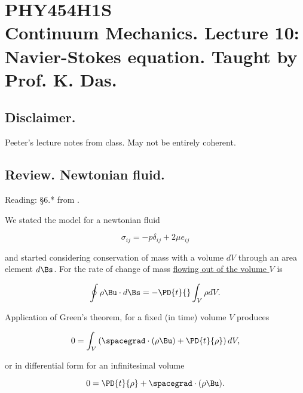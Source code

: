 
%

\chapter{PHY454H1S\\Continuum Mechanics.  Lecture 10: Navier-Stokes equation.  Taught by Prof. K. Das.}
\label{chap:continuumL10}
{}
\date{Feb 10, 2012}

\beginArtWithToc

\section{Disclaimer.}

Peeter's lecture notes from class.  May not be entirely coherent.

\section{Review.  Newtonian fluid.}

Reading: \S 6.* from \cite{acheson1990elementary}.

We stated the model for a newtonian fluid

\begin{equation}\label{eqn:continuumL10:10}
\sigma_{ij} = -p \delta_{ij} + 2 \mu e_{ij}
\end{equation}

and started considering conservation of mass with a volume $dV$ through an area element $d\Bs$.  For the rate of change of mass \underline{flowing out of the volume $V$} is 

\begin{equation}\label{eqn:continuumL10:30}
\oint \rho \Bu \cdot d\Bs = - \PD{t}{} \int_V \rho dV.
\end{equation}

Application of Green's theorem, for a fixed (in time) volume $V$ produces

\begin{equation}\label{eqn:continuumL10:50}
0 = \int_V \left( \spacegrad \cdot (\rho \Bu) + \PD{t}{\rho} \right) dV,
\end{equation}

or in differential form for an infinitesimal volume

\begin{equation}\label{eqn:continuumL10:70}
0 = \PD{t}{\rho} + \spacegrad \cdot (\rho \Bu).
\end{equation}

